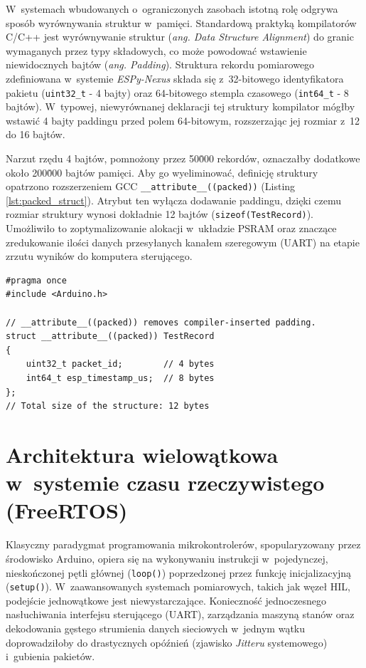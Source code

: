 W~systemach wbudowanych o~ograniczonych zasobach istotną rolę odgrywa sposób wyrównywania struktur w~pamięci.
Standardową praktyką kompilatorów C/C++ jest wyrównywanie struktur (\textit{ang. Data Structure Alignment}) do granic wymaganych przez typy składowych, co może powodować wstawienie niewidocznych bajtów (\textit{ang. Padding}).
Struktura rekordu pomiarowego zdefiniowana w~systemie \textit{ESPy-Nexus} składa się z~32-bitowego identyfikatora pakietu (\texttt{uint32\_t} - 4 bajty) oraz 64-bitowego stempla czasowego (\texttt{int64\_t} - 8 bajtów).
W~typowej, niewyrównanej deklaracji tej struktury kompilator mógłby wstawić 4 bajty paddingu przed polem 64-bitowym, rozszerzając jej rozmiar z~12 do 16 bajtów.

Narzut rzędu 4 bajtów, pomnożony przez 50\.000 rekordów, oznaczałby dodatkowe około 200\.000 bajtów pamięci.
Aby go wyeliminować, definicję struktury opatrzono rozszerzeniem GCC \texttt{\_\_attribute\_\_((packed))} (Listing \ref{lst:packed_struct}).
Atrybut ten wyłącza dodawanie paddingu, dzięki czemu rozmiar struktury wynosi dokładnie 12 bajtów (\texttt{sizeof(TestRecord)}).
Umożliwiło to zoptymalizowanie alokacji w~układzie PSRAM oraz znaczące zredukowanie ilości danych przesyłanych kanałem szeregowym (UART) na etapie zrzutu wyników do komputera sterującego.

\begin{listing}[htbp]
    \caption{Struktura \texttt{TestRecord} - eliminacja pustych bajtów wyrównania w~strukturze pomiarowej (\texttt{TestRecord.h}) \cite{espy_nexus_esp32_firmware}.}
    \label{lst:packed_struct}
    \begin{verbatim}
#pragma once
#include <Arduino.h>

// __attribute__((packed)) removes compiler-inserted padding.
struct __attribute__((packed)) TestRecord
{
    uint32_t packet_id;        // 4 bytes
    int64_t esp_timestamp_us;  // 8 bytes
};
// Total size of the structure: 12 bytes
\end{verbatim}
\end{listing}

\section{Architektura wielowątkowa w~systemie czasu rzeczywistego (FreeRTOS)}
\label{sec:freertos_architektura}

Klasyczny paradygmat programowania mikrokontrolerów, spopularyzowany przez środowisko Arduino, opiera się na wykonywaniu instrukcji w~pojedynczej, nieskończonej pętli głównej (\texttt{loop()}) poprzedzonej przez funkcję inicjalizacyjną (\texttt{setup()}).
W~zaawansowanych systemach pomiarowych, takich jak węzeł HIL, podejście jednowątkowe jest niewystarczające.
Konieczność jednoczesnego nasłuchiwania interfejsu sterującego (UART), zarządzania maszyną stanów oraz dekodowania gęstego strumienia danych sieciowych w~jednym wątku doprowadziłoby do drastycznych opóźnień (zjawisko \textit{Jitteru} systemowego) i~gubienia pakietów.

